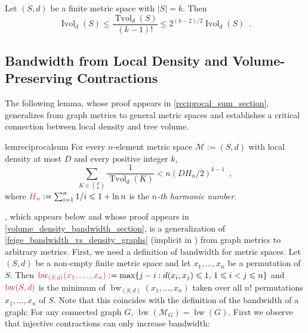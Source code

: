 \documentclass{patmorin}
\makeatletter
\renewcommand{\le}{\leqslant}
\newcommand{\david}[1]{{\color{orange} David: #1}}
\newcommand{\pat}[1]{\textcolor{Blue}{Pat: #1}}
\newcommand{\defin}[1]{\emph{\textcolor{brightmaroon}{#1}}}
\def\mathcolor#1#{\@mathcolor{#1}}
\def\@mathcolor#1#2#3{%
  \protect\leavevmode
  \begingroup
    \color#1{#2}#3%
  \endgroup
}
\newcommand{\mathdefin}[1]{\mathcolor{brightmaroon}{#1}}
\DeclareMathOperator{\bw}{bw}
\DeclareMathOperator{\ivol}{Ivol}
\DeclareMathOperator{\tvol}{Tvol}
\makeatother
\begin{document}
\begin{lem}
  Let $(S,d)$ be a finite metric space with $|S|=k$.  Then
  \[
    \ivol_{d}(S) \le \frac{\tvol_d(S)}{(k-1)!} \le 2^{(k-2)/2}\ivol_d(S) \enspace .
  \]
\end{lem}

\subsection{Bandwidth from Local Density and Volume-Preserving Contractions}

The following lemma, whose proof appears in \cref{reciprocal_sum_section}, generalizes \citet[Theorem~10]{feige:approximating} from graph metrics to general metric spaces and establishes a critical connection between local density and tree volume.

\begin{restatable}{lem}{reciprocalsum}\label{reciprocal_sum}
  For every $n$-element metric space $\mathcal{M}:=(S,d)$ with local density at most $D$ and every positive integer $k$,
  \[
    \sum_{K\in \binom{S}{k}}\frac{1}{\tvol_{d}(K)} < n(DH_n/2)^{k-1} \enspace ,
  \]
  where $\mathdefin{H_n}:=\sum_{i=1}^n 1/i\le 1+\ln n$ is the \defin{$n$-th harmonic number}.
\end{restatable}



, which appears below and whose proof appears in
\cref{volume_density_bandwidth_section}, is a generalization of \cref{feige_bandwidth_vs_density_graphs} (implicit in \citet{feige:approximating}) from graph metrics to arbitrary metrics.
First, we need a definition of bandwidth for metric spaces.  Let $(S,d)$ be a non-empty finite metric space and let $x_1,\ldots,x_n$ be a permutation of $S$.  Then $\mathdefin{\bw_{(S,d)}(x_1,\ldots,x_n)}:=\max\{j-i:d(x_i,x_j)\le 1,\, 1\le i <j\le n\}$ and $\mathdefin{\bw(S,d)}$ is the minimum of $\bw_{(S,d)}(x_1,\ldots,x_n)$ taken over all $n!$ permutations $x_1,\ldots,x_n$ of $S$.  Note that this coincides with the definition of the bandwidth of a graph: For any connected graph $G$, $\bw(\mathcal{M}_G)=\bw(G)$.  First we observe that injective
contractions can only increase bandwidth:
\end{document}
